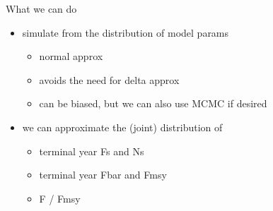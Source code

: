 \documentclass{beamer}\usepackage[]{graphicx}\usepackage[]{color}
\begin{document}
\begin{frame}{What we can do}

\begin{itemize}
\item simulate from the distribution of model params
\begin{itemize}
\item normal approx
\item avoids the need for delta approx
\item can be biased, but we can also use MCMC if desired
\end{itemize}
\item we can approximate the (joint) distribution of
\begin{itemize}
\item terminal year Fs and Ns
\item terminal year Fbar and Fmsy
\item F / Fmsy
\end{itemize}
\end{itemize}

\end{frame}
\end{document}
